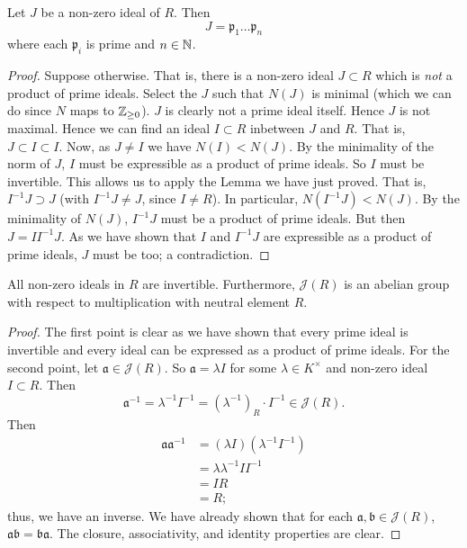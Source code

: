 \begin{theorem}[]
	Let $J$ be a non-zero ideal of $R$.
	Then
	\[
		J = \mathfrak p_1 \ldots \mathfrak p_n
	\]
	where each $\mathfrak p_i$ is prime and $n \in \mathbb{N}$.
\end{theorem}

\begin{proof}
	Suppose otherwise.
	That is, there is a non-zero ideal $J \subset R$ which is
	\emph{not} a product of prime ideals.
	Select the $J$ such that $N(J)$ is minimal
	(which we can do since $N$ maps to $\mathbb{Z}_{\geq 0}$).
	$J$ is clearly not a prime ideal itself.
	Hence $J$ is not maximal.
	Hence we can find an ideal $I \subset R$ inbetween $J$ and $R$.
	That is, $J \subset I \subset I$.
	Now, as $J \neq I$ we have $N(I) < N(J)$.
	By the minimality of the norm of $J$, $I$ must be expressible as a product
	of prime ideals.
	So $I$ must be invertible.
	This allows us to apply the Lemma we have just proved.
	That is, $I^{-1} J \supset J$
	(with $I^{-1}J \neq J$, since $I \neq R$).
	In particular, $N(I^{-1}J) < N(J)$.
	By the minimality of $N(J)$, $I^{-1}J$ must be a product of prime ideals.
	But then $J = II^{-1} J$.
	As we have shown that $I$ and $I^{-1}J$ are expressible as a product of
	prime ideals, $J$ must be too; a contradiction.
\end{proof}

\begin{corollary}[]
	All non-zero ideals in $R$ are invertible.
	Furthermore, $\mathcal J(R)$ is an abelian group with respect to 
	multiplication with neutral element $R$.
\end{corollary}

\begin{proof}
	The first point is clear as we have shown that every prime ideal
	is invertible and every ideal can be expressed as a product of prime ideals.
	For the second point, let $\mathfrak a \in \mathcal J(R)$.
	So $\mathfrak a = \lambda I$ for some $\lambda \in K^\times$ and
	non-zero ideal $I \subset R$.
	Then
	\[
		\mathfrak a^{-1} 
		= \lambda^{-1}I^{-1}
		= (\lambda^{-1})_R \cdot I^{-1}
		\in \mathcal J(R).
	\]
	Then
	\begin{align*}
		\mathfrak a \mathfrak a^{-1}
		&= (\lambda I) (\lambda^{-1} I^{-1}) \\
		&= \lambda \lambda^{-1} I I^{-1} \\
		&= IR \\
		&= R;
	\end{align*}
	thus, we have an inverse.
	We have already shown that for each $\mathfrak a, \mathfrak b \in
	\mathcal J(R)$,
	$\mathfrak a \mathfrak b = \mathfrak b \mathfrak a$.
	The closure, associativity, and identity properties are clear.
\end{proof}

